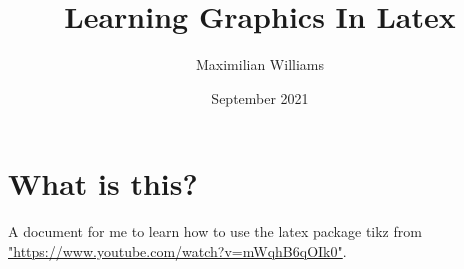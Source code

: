 \documentclass{article}
\title{Learning Graphics In Latex}
\author{Maximilian Williams}
\date{September 2021}
\begin{document}
\maketitle

\section*{What is this?}
A document for me to learn how to use the latex package tikz from \url{"https://www.youtube.com/watch?v=mWqhB6qOIk0"}.
\end{document}
